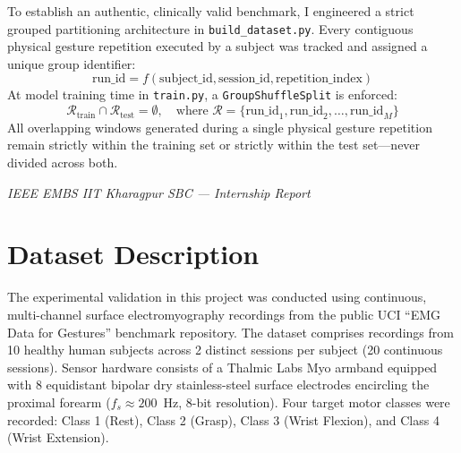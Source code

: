 \documentclass[12pt,a4paper]{article}
\begin{document}
To establish an authentic, clinically valid benchmark, I engineered a strict grouped partitioning architecture in \texttt{build\_dataset.py}. Every contiguous physical gesture repetition executed by a subject was tracked and assigned a unique group identifier:
\begin{equation}
    \text{run\_id} = f(\text{subject\_id}, \text{session\_id}, \text{repetition\_index})
\end{equation}
At model training time in \texttt{train.py}, a \texttt{GroupShuffleSplit} is enforced:
\begin{equation}
    \mathcal{R}_{\text{train}} \cap \mathcal{R}_{\text{test}} = \emptyset, \quad \text{where } \mathcal{R} = \{\text{run\_id}_1, \text{run\_id}_2, \dots, \text{run\_id}_M\}
\end{equation}
All overlapping windows generated during a single physical gesture repetition remain strictly within the training set or strictly within the test set---never divided across both.

\vfill
\begin{center}
    \footnotesize\textit{IEEE EMBS IIT Kharagpur SBC --- Internship Report}
\end{center}

\newpage
\section{Dataset Description}\label{sec:dataset}

The experimental validation in this project was conducted using continuous, multi-channel surface electromyography recordings from the public UCI ``EMG Data for Gestures'' benchmark repository. The dataset comprises recordings from 10 healthy human subjects across 2 distinct sessions per subject (20 continuous sessions). Sensor hardware consists of a Thalmic Labs Myo armband equipped with 8 equidistant bipolar dry stainless-steel surface electrodes encircling the proximal forearm ($f_s \approx 200$~Hz, 8-bit resolution). Four target motor classes were recorded: Class 1 (Rest), Class 2 (Grasp), Class 3 (Wrist Flexion), and Class 4 (Wrist Extension).
\end{document}
